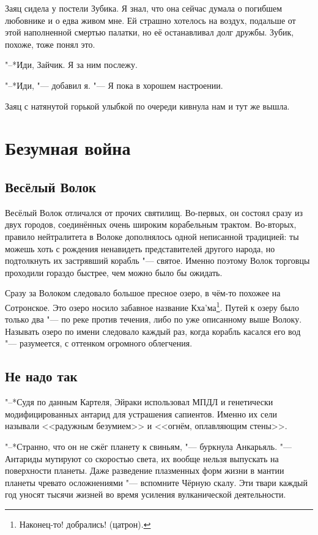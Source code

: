 Заяц сидела у постели Зубика.
Я знал, что она сейчас думала о погибшем любовнике и о едва живом мне.
Ей страшно хотелось на воздух, подальше от этой наполненной смертью палатки, но её останавливал долг дружбы.
Зубик, похоже, тоже понял это.

"--*Иди, Зайчик.
Я за ним послежу.

"--*Иди, "--- добавил я.
"--- Я пока в хорошем настроении.

Заяц с натянутой горькой улыбкой по очереди кивнула нам и тут же вышла.

\chapter{Безумная война}

\section{Весёлый Волок}

Весёлый Волок отличался от прочих святилищ.
Во-первых, он состоял сразу из двух городов, соединённых очень широким корабельным трактом.
Во-вторых, правило нейтралитета в Волоке дополнялось одной неписанной традицией: ты можешь хоть с рождения ненавидеть представителей другого народа, но подтолкнуть их застрявший корабль "--- святое.
Именно поэтому Волок торговцы проходили гораздо быстрее, чем можно было бы ожидать.

Сразу за Волоком следовало большое пресное озеро, в чём-то похожее на Сотронское.
Это озеро носило забавное название Кха'ма\footnote{Наконец-то! добрались! (цатрон). \authornote}.
Путей к озеру было только два "--- по реке против течения, либо по уже описанному выше Волоку.
Называть озеро по имени следовало каждый раз, когда корабль касался его вод "--- разумеется, с оттенком огромного облегчения.

\section{Не надо так}

"--*Судя по данным Картеля, Эйраки использовал МПДЛ и генетически модифицированных антарид для устрашения сапиентов.
Именно их сели называли <<радужным безумием>> и <<огнём, оплавляющим стены>>.

"--*Странно, что он не сжёг планету к свиньям, "--- буркнула Анкарьяль.
"--- Антариды мутируют со скоростью света, их вообще нельзя выпускать на поверхности планеты.
Даже разведение плазменных форм жизни в мантии планеты чревато осложнениями "--- вспомните Чёрную скалу.
Эти твари каждый год уносят тысячи жизней во время усиления вулканической деятельности.

